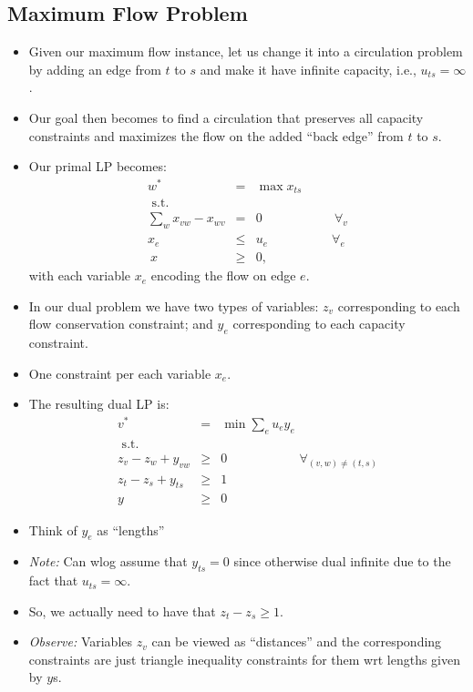 \documentclass{article}
\begin{document}
\subsection{Maximum Flow Problem}

\begin{itemize}
\item Given our maximum flow instance, let us change it into a circulation problem by adding an edge from $t$ to $s$ and make it have infinite capacity, i.e., $u_{ts}=\infty$. 
\item Our goal then becomes to find a circulation that preserves all capacity constraints and maximizes the flow on the added ``back edge'' from $t$ to $s$. 
\item Our primal LP becomes:
\begin{eqnarray*}
w^*& = &\max x_{ts}\\
\text{ s.t.} & &\\
\sum_w x_{vw}-x_{wv} &= &0 \quad \quad\quad\quad\quad \text{  $\forall_{v}$}\\
x_{e} &\le &u_{e} \quad \quad\quad\quad\quad \text{$\forall_{e}$}\\\
x &\ge &0,
\end{eqnarray*}
with each variable $x_e$ encoding the flow on edge $e$.
\item In our dual problem we have two types of variables: $z_v$ corresponding to each flow conservation constraint; and $y_e$ corresponding to each capacity constraint.
\item One constraint per each variable $x_e$.  
\item The resulting dual LP is:
\begin{eqnarray*}
v^*&=&\min \sum_{e} u_e y_{e}\\
\text{ s.t.} & &\\
z_v-z_w+y_{vw} &\ge &0 \quad \quad\quad\quad\quad \text{  $\forall_{(v,w)\neq (t,s)}$}\\
z_t-z_s+y_{ts} &\ge &1\\
y &\ge &0
\end{eqnarray*}
\item Think of $y_{e}$ as ``lengths''
\item {\em Note:} Can wlog assume that $y_{ts}=0$ since otherwise dual infinite due to the fact that $u_{ts}=\infty$.
\item  So, we actually need to have that $z_t-z_s \ge 1$.
\item {\em Observe:} Variables $z_v$ can be viewed as ``distances'' and the corresponding constraints are just triangle inequality constraints for them wrt lengths given by $y$s. 

\end{itemize}
\end{document}
